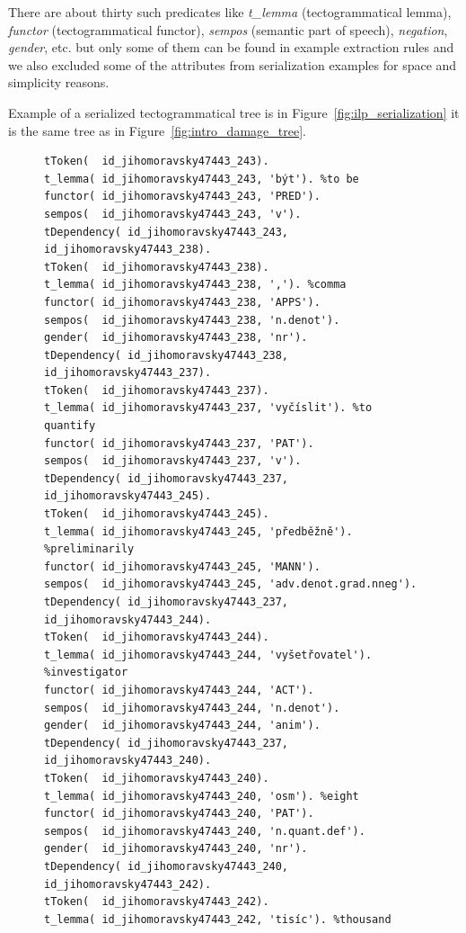 \noindent There are about thirty such predicates like \emph{t\_lemma} (tectogrammatical lemma), \emph{functor} (tectogrammatical functor), \emph{sempos} (semantic part of speech), \emph{negation}, \emph{gender}, etc. but only some of them can be found in example extraction rules and we also excluded some of the attributes from serialization examples for space and simplicity reasons.

Example of a serialized tectogrammatical tree is in Figure~\ref{fig:ilp_serialization} it is the same tree as in Figure~\ref{fig:intro_damage_tree}.


\begin{figure}
\begin{verbatim}
tToken(  id_jihomoravsky47443_243).
t_lemma( id_jihomoravsky47443_243, 'být'). %to be
functor( id_jihomoravsky47443_243, 'PRED').
sempos(  id_jihomoravsky47443_243, 'v').
tDependency( id_jihomoravsky47443_243, id_jihomoravsky47443_238).
tToken(  id_jihomoravsky47443_238).
t_lemma( id_jihomoravsky47443_238, ','). %comma
functor( id_jihomoravsky47443_238, 'APPS').
sempos(  id_jihomoravsky47443_238, 'n.denot').
gender(  id_jihomoravsky47443_238, 'nr').
tDependency( id_jihomoravsky47443_238, id_jihomoravsky47443_237).
tToken(  id_jihomoravsky47443_237).
t_lemma( id_jihomoravsky47443_237, 'vyčíslit'). %to quantify
functor( id_jihomoravsky47443_237, 'PAT').
sempos(  id_jihomoravsky47443_237, 'v').
tDependency( id_jihomoravsky47443_237, id_jihomoravsky47443_245).
tToken(  id_jihomoravsky47443_245).
t_lemma( id_jihomoravsky47443_245, 'předběžně'). %preliminarily
functor( id_jihomoravsky47443_245, 'MANN').
sempos(  id_jihomoravsky47443_245, 'adv.denot.grad.nneg').
tDependency( id_jihomoravsky47443_237, id_jihomoravsky47443_244).
tToken(  id_jihomoravsky47443_244).
t_lemma( id_jihomoravsky47443_244, 'vyšetřovatel'). %investigator
functor( id_jihomoravsky47443_244, 'ACT').
sempos(  id_jihomoravsky47443_244, 'n.denot').
gender(  id_jihomoravsky47443_244, 'anim').
tDependency( id_jihomoravsky47443_237, id_jihomoravsky47443_240).
tToken(  id_jihomoravsky47443_240).
t_lemma( id_jihomoravsky47443_240, 'osm'). %eight
functor( id_jihomoravsky47443_240, 'PAT').
sempos(  id_jihomoravsky47443_240, 'n.quant.def').
gender(  id_jihomoravsky47443_240, 'nr').
tDependency( id_jihomoravsky47443_240, id_jihomoravsky47443_242).
tToken(  id_jihomoravsky47443_242).
t_lemma( id_jihomoravsky47443_242, 'tisíc'). %thousand

\end{verbatim}
\end{figure}
